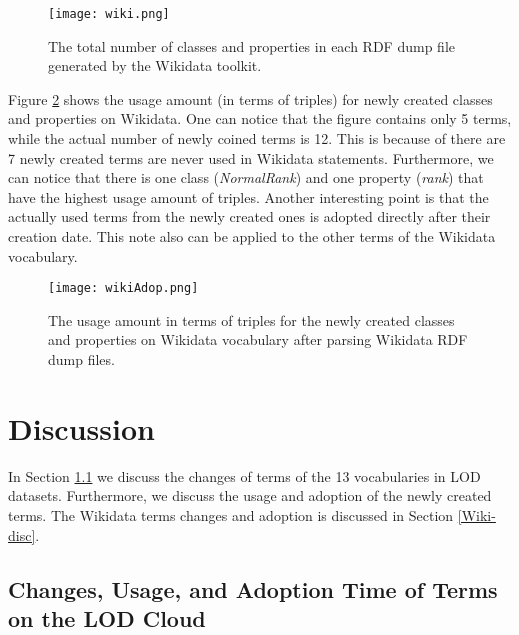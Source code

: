 \begin{figure}
	\centering
	\texttt{[image: wiki.png]}
	\caption{The total number of classes and properties in each RDF dump file generated by the Wikidata toolkit.}
	\label{fig:wiki}
\end{figure}

Figure \ref{fig:wikiNew} shows the usage amount (in terms of triples) for newly created classes and properties on Wikidata. 
%
One can notice that the figure contains only 5 terms, while the actual number of newly coined terms is 12. This is because of there are 7 newly created terms are never used in Wikidata statements. Furthermore, we can notice that there is one class (\textit{NormalRank}) and one property (\textit{rank}) that have the highest usage amount of triples.
Another interesting point is that the actually used terms from the newly created ones is adopted directly after their creation date. This note also can be applied to the other terms of the Wikidata vocabulary.

\begin{figure}
	\centering
	\texttt{[image: wikiAdop.png]}
	\caption{The usage amount in terms of triples for the newly created classes and properties on Wikidata vocabulary after parsing Wikidata RDF dump files.}
	\label{fig:wikiNew}
\end{figure}

\section{Discussion}\label{sec:Discussion}
In Section \ref{changes} we discuss the changes of terms of the 13 vocabularies in LOD datasets. Furthermore, we discuss the usage and adoption of the newly created terms. The Wikidata terms changes and adoption is discussed in Section \ref{Wiki-disc}.

\subsection{Changes, Usage, and Adoption Time of Terms on the LOD Cloud} \label{changes}

